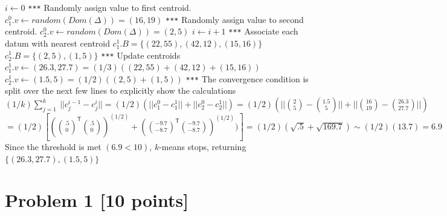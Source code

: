 \documentclass{article}
\begin{document}
\begin{center}
\begin{algorithmic}[1]
\State $i \gets 0$
\State \texttt{***} Randomly assign value to first centroid.
\State $c^0_1.v \gets random(Dom(\Delta)) = (16,19)$
\State \texttt{***} Randomly assign value to second centroid.
\State $c^0_2.v \gets random(Dom(\Delta)) = (2,5)$
\State $i \gets i + 1$
\State \texttt{***} Associate each datum with nearest centroid
\State $c^1_1.B = \{(22, 55), (42, 12), (15,16)\}$
\State $c^1_2.B = \{(2,5), (1,5)\}$
\State \texttt{***} Update centroids
\State $c^1_1.v \gets (26.3, 27.7) = (1/3)((22,55) + (42,12) + (15,16))$
\State $c^1_2.v \gets (1.5, 5) = (1/2)((2,5) + (1,5))$
\State \texttt{***} The convergence condition is split over the next few lines to explicitly show the calculations
\State $(1/k)\sum_{j=1}^k~|| c^{i-1}_j-c^{i}_j|| = (1/2)(||c^0_1 - c^1_1||+ ||c^0_2 - c^1_2||) = (1/2) (||{2 \choose 5} - {1.5 \choose 5}|| + ||{16 \choose 19} - {26.3 \choose 27.7}||)$
\State $ = (1/2)[({.5 \choose 0}^{\mathsf{T}}{.5 \choose 0})^{(1/2)} + ({-9.7 \choose  -8.7}^{\mathsf{T}}{-9.7 \choose  -8.7})^{(1/2)})] = (1/2)(\sqrt{.5} + \sqrt{169.7}) \sim (1/2)(13.7) = 6.9$
\State Since the threshold is met $(6.9 < 10)$, $k$-means stops, returning $\{(26.3, 27.7), (1.5,5)\}$
\end{algorithmic}
\end{center}

\pagebreak


\section*{Problem 1 [10 points]} 
\end{document}
